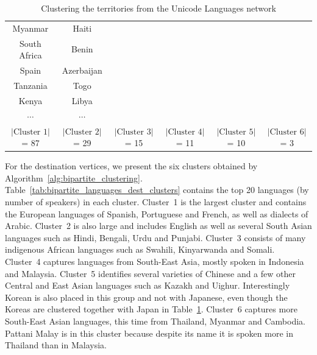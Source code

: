 \documentclass[12pt,draft]{ociamthesis}
\theoremstyle{plain}
\theoremstyle{definition}
\theoremstyle{remark}
\begin{document}
\begin{table}[H]
\begin{tabular}{ |c|c|c|c|c|c| }
    Myanmar & Haiti & & & & \\
    South Africa & Benin & & & & \\
    Spain & Azerbaijan & & & & \\
    Tanzania & Togo & & & & \\
    Kenya & Libya & & & & \\
    $\cdots$ & $\cdots$ & & & & \\
    $|\textrm{Cluster\ } 1 |$ = 87 &
    $|\textrm{Cluster\ } 2 |$ = 29 &
    $|\textrm{Cluster\ } 3 |$ = 15 &
    $|\textrm{Cluster\ } 4 |$ = 11 &
    $|\textrm{Cluster\ } 5 |$ = 10 &
    $|\textrm{Cluster\ } 6 |$ = 3
    \\[0.1cm]
    \hline
  \end{tabular}
  \caption{Clustering the territories from the Unicode Languages network}
  \label{tab:bipartite_languages_source_clusters}
\end{table}

For the destination vertices, we present the six clusters obtained by
Algorithm~\ref{alg:bipartite_clustering}.
Table~\ref{tab:bipartite_languages_dest_clusters} contains the top 20 languages
(by number of speakers) in each cluster.
Cluster~1 is the largest cluster and contains the European languages of
Spanish, Portuguese and French, as well as dialects of Arabic.
Cluster~2 is also large and includes English as well as several South Asian
languages such as Hindi, Bengali, Urdu and Punjabi.
Cluster~3 consists of many indigenous African languages such as Swahili,
Kinyarwanda and Somali.
Cluster~4 captures languages from South-East Asia, mostly spoken in Indonesia
and Malaysia.
Cluster~5 identifies several varieties of Chinese and a few other Central and
East Asian languages such as Kazakh and Uighur. Interestingly Korean is also
placed in this group and not with Japanese, even though the Koreas are
clustered together with Japan in
Table~\ref{tab:bipartite_languages_source_clusters}.
Cluster~6 captures more South-East Asian languages, this time from Thailand,
Myanmar and Cambodia. Pattani Malay is in this cluster because despite its name
it is spoken more in Thailand than in Malaysia.
\end{document}
